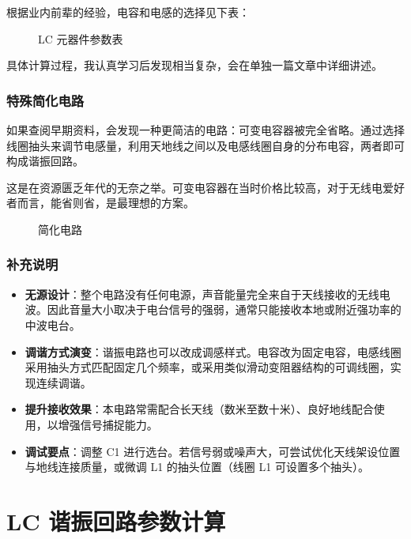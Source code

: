 \documentclass[12pt,UTF8]{ctexbook}
\begin{document}
根据业内前辈的经验，电容和电感的选择见下表：

\begin{figure}[H]
	\centering
	\caption{LC 元器件参数表}
	\label{fig:lc-parameters}
\end{figure}

具体计算过程，我认真学习后发现相当复杂，会在单独一篇文章中详细讲述。

\subsection{特殊简化电路}

如果查阅早期资料，会发现一种更简洁的电路：可变电容器被完全省略。通过选择线圈抽头来调节电感量，利用天地线之间以及电感线圈自身的分布电容，两者即可构成谐振回路。

这是在资源匮乏年代的无奈之举。可变电容器在当时价格比较高，对于无线电爱好者而言，能省则省，是最理想的方案。

\begin{figure}[H]
	\centering
	\caption{简化电路}
	\label{fig:simplified-circuit}
\end{figure}

\subsection{补充说明}

\begin{itemize}[leftmargin=2cm]
	\item \textbf{无源设计}：整个电路没有任何电源，声音能量完全来自于天线接收的无线电波。因此音量大小取决于电台信号的强弱，通常只能接收本地或附近强功率的中波电台。
	\item \textbf{调谐方式演变}：谐振电路也可以改成调感样式。电容改为固定电容，电感线圈采用抽头方式匹配固定几个频率，或采用类似滑动变阻器结构的可调线圈，实现连续调谐。
	\item \textbf{提升接收效果}：本电路常需配合长天线（数米至数十米）、良好地线配合使用，以增强信号捕捉能力。
	\item \textbf{调试要点}：调整 C1 进行选台。若信号弱或噪声大，可尝试优化天线架设位置与地线连接质量，或微调 L1 的抽头位置（线圈 L1 可设置多个抽头）。
\end{itemize}


\chapter{LC 谐振回路参数计算}
\label{chap:lc-calculation}
\end{document}
